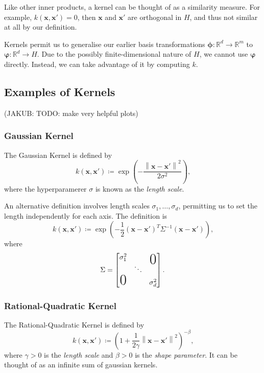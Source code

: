 \documentclass[11pt,twoside]{report}
\newcommand\bx{\mathbf{x}}
\newcommand\bphi{\bm{\phi}}
\newcommand\bvarphi{\bm{\varphi}}
\newcommand\bbR{\mathbb{R}}
\newcommand\norm[1]{\left\|#1\right\|}
\newcommand\jakub[1]{{\color{red}(JAKUB: #1)}}
\begin{document}
Like other inner products, a kernel can be thought of as a similarity measure. For example, $k(\bx, \bx') = 0$, then $\bx$ and $\bx'$ are orthogonal in $H$, and thus not similar at all by our definition.

Kernels permit us to generalise our earlier basis transformations $\bphi : \bbR^d \to \bbR^m$ to $\bvarphi : \bbR^d \to H$. Due to the possibly finite-dimensional nature of $H$, we cannot use $\bvarphi$ directly. Instead, we can take advantage of it by computing $k$.

\subsection{Examples of Kernels}

\jakub{TODO: make very helpful plots}

\subsubsection{Gaussian Kernel}

The Gaussian Kernel is defined by \[
    k(\bx, \bx') \coloneqq \exp\left( - \frac{\norm{\bx - \bx'}^2}{2\sigma^2} \right) \text{,}
\] where the hyperparamerer $\sigma$ is known as the \textit{length scale}.

An alternative definition involves length scales $\sigma_1, \dots, \sigma_d$, permitting us to set the length independently for each axis. The definition is \[
    k(\bx, \bx') \coloneqq \exp\left( - \frac{1}{2}\left(\bx - \bx'\right)^T\Sigma^{-1}\left(\bx - \bx'\right) \right) \text{,}
\] where \[
    \Sigma = \begin{bmatrix}
        \sigma_1^2 & & \makebox(0,0){\text{\huge0}} \\
        & \ddots & \\
        \mbox{\huge 0} & & \sigma_d^2
    \end{bmatrix} \text{.}
\]

\subsubsection{Rational-Quadratic Kernel}

The Rational-Quadratic Kernel is defined by \[
    k(\bx, \bx') \coloneqq \left(1 + \frac{1}{2\gamma}\norm{\bx - \bx'}^2\right)^{-\beta} \text{,}
\] where $\gamma > 0$ is the \textit{length scale} and $\beta > 0$ is the \textit{shape parameter}. It can be thought of as an infinite sum of gaussian kernels.
\end{document}
